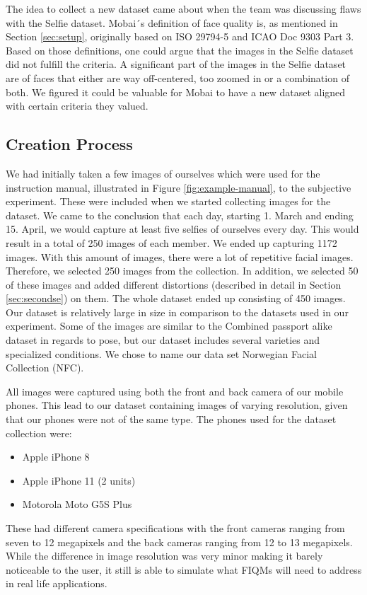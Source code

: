 The idea to collect a new dataset came about when the team was discussing flaws with the Selfie dataset. Mobai´s definition of face quality is, as mentioned in Section \ref{sec:setup}, originally based on ISO 29794-5 and ICAO Doc 9303 Part 3. Based on those definitions, one could argue that the images in the Selfie dataset did not fulfill the criteria. A significant part of the images in the Selfie dataset are of faces that either are way off-centered, too zoomed in or a combination of both. We figured it could be valuable for Mobai to have a new dataset aligned with certain criteria they valued. 

\subsection{Creation Process}
We had initially taken a few images of ourselves which were used for the instruction manual, illustrated in Figure \ref{fig:example-manual}, to the subjective experiment. These were included when we started collecting images for the dataset. We came to the conclusion that each day, starting 1. March and ending 15. April, we would capture at least five selfies of ourselves every day. This would result in a total of 250 images of each member. We ended up capturing 1172 images. With this amount of images, there were a lot of repetitive facial images. Therefore, we selected 250 images from the collection. In addition, we selected 50 of these images and added different distortions (described in detail in Section \ref{sec:secondse}) on them. The whole dataset ended up consisting of 450 images. Our dataset is relatively large in size in comparison to the datasets used in our experiment. Some of the images are similar to the Combined passport alike dataset in regards to pose, but our dataset includes several varieties and specialized conditions. We chose to name our data set Norwegian Facial Collection (NFC).

All images were captured using both the front and back camera of our mobile phones. This lead to our dataset containing images of varying resolution, given that our phones were not of the same type. The phones used for the dataset collection were:
\begin{itemize}
    \item Apple iPhone 8 
    \item Apple iPhone 11 (2 units)
    \item Motorola Moto G5S Plus 
\end{itemize}
%
These had different camera specifications with the front cameras ranging from seven to 12 megapixels and the back cameras ranging from 12 to 13 megapixels. While the difference in image resolution was very minor making it barely noticeable to the user, it still is able to simulate what FIQMs will need to address in real life applications. 

